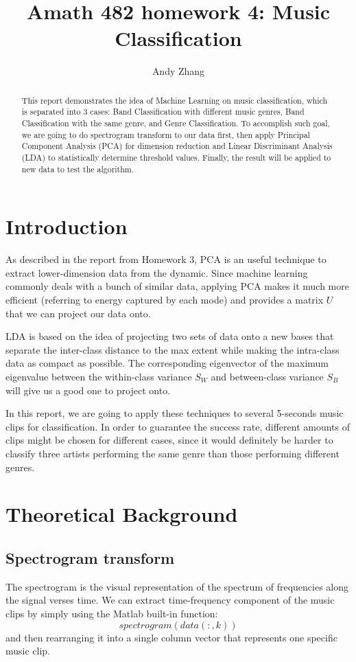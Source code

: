 \documentclass[10pt]{article}
\begin{document}
\title{Amath 482 homework 4: Music Classification}
\author{Andy Zhang}
\maketitle

\begin{abstract}
This report demonstrates the idea of Machine Learning on music classification, which is separated into 3 cases: Band Classification with different music genres, Band Classification with the same genre, and Genre Classification. To accomplish such goal, we are going to do spectrogram transform to our data first, then apply Principal Component Analysis (PCA) for dimension reduction and Linear Discriminant Analysis (LDA) to statistically determine threshold values. Finally, the result will be applied to new data to test the algorithm.
\end{abstract}

\section{Introduction}
As described in the report from Homework 3, PCA is an useful technique to extract lower-dimension data from the dynamic. Since machine learning commonly deals with a bunch of similar data, applying PCA makes it much more efficient (referring to energy captured by each mode) and provides a matrix $U$ that we can project our data onto.
\par
\vskip 0.1cm
LDA is based on the idea of projecting two sets of data onto a new bases that separate the inter-class distance to the max extent while making the intra-class data as compact as possible. The corresponding eigenvector of the maximum eigenvalue between the within-class variance $S_W$ and between-class variance $S_B$ will give us a good one to project onto.
\par
\vskip 0.1cm
In this report, we are going to apply these techniques to several 5-seconds music clips for classification. In order to guarantee the success rate, different amounts of clips might be chosen for different cases, since it would definitely be harder to classify three artists performing the same genre than those performing different genres.

\section{Theoretical Background}
\subsection{Spectrogram transform}
The spectrogram is the visual representation of the spectrum of frequencies along the signal verses time. We can extract time-frequency component of the music clips by simply using the Matlab built-in function:
\begin{equation}\label{1}
spectrogram(data(:, k))
\end{equation}
and then rearranging it into a single column vector that represents one specific music clip.
\end{document}
